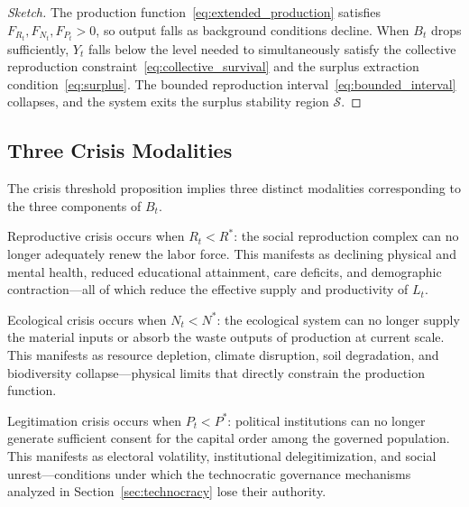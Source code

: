 \documentclass[12pt,a4paper]{article}
\theoremstyle{definition}
\theoremstyle{remark}
\begin{document}
\begin{proof}[Sketch]
The production function~\eqref{eq:extended_production} satisfies $F_{R_t}, F_{N_t}, F_{P_t} > 0$, so output falls as background conditions decline. When $B_t$ drops sufficiently, $Y_t$ falls below the level needed to simultaneously satisfy the collective reproduction constraint~\eqref{eq:collective_survival} and the surplus extraction condition~\eqref{eq:surplus}. The bounded reproduction interval~\eqref{eq:bounded_interval} collapses, and the system exits the surplus stability region $\mathcal{S}$.
\end{proof}

\subsection{Three Crisis Modalities}

The crisis threshold proposition implies three distinct modalities corresponding to the three components of $B_t$.

Reproductive crisis occurs when $R_t < R^*$: the social reproduction complex can no longer adequately renew the labor force. This manifests as declining physical and mental health, reduced educational attainment, care deficits, and demographic contraction---all of which reduce the effective supply and productivity of $L_t$.

Ecological crisis occurs when $N_t < N^*$: the ecological system can no longer supply the material inputs or absorb the waste outputs of production at current scale. This manifests as resource depletion, climate disruption, soil degradation, and biodiversity collapse---physical limits that directly constrain the production function.

Legitimation crisis occurs when $P_t < P^*$: political institutions can no longer generate sufficient consent for the capital order among the governed population. This manifests as electoral volatility, institutional delegitimization, and social unrest---conditions under which the technocratic governance mechanisms analyzed in Section~\ref{sec:technocracy} lose their authority.
\end{document}
